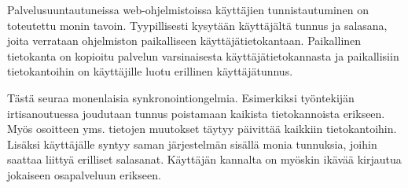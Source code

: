 Palvelusuuntautuneissa web-ohjelmistoissa käyttäjien tunnistautuminen on toteutettu monin tavoin. Tyypillisesti kysytään käyttäjältä tunnus ja salasana, joita verrataan ohjelmiston paikalliseen käyttäjätietokantaan. Paikallinen tietokanta on kopioitu palvelun varsinaisesta käyttäjätietokannasta ja paikallisiin tietokantoihin on käyttäjille luotu erillinen käyttäjätunnus.

Tästä seuraa monenlaisia synkronointiongelmia. Esimerkiksi työntekijän irtisanoutuessa joudutaan tunnus poistamaan kaikista tietokannoista erikseen. Myös osoitteen yms. tietojen muutokset täytyy päivittää kaikkiin tietokantoihin. Lisäksi käyttäjälle syntyy saman järjestelmän sisällä monia tunnuksia, joihin saattaa liittyä erilliset salasanat. Käyttäjän kannalta on myöskin ikävää kirjautua jokaiseen osapalveluun erikseen.
